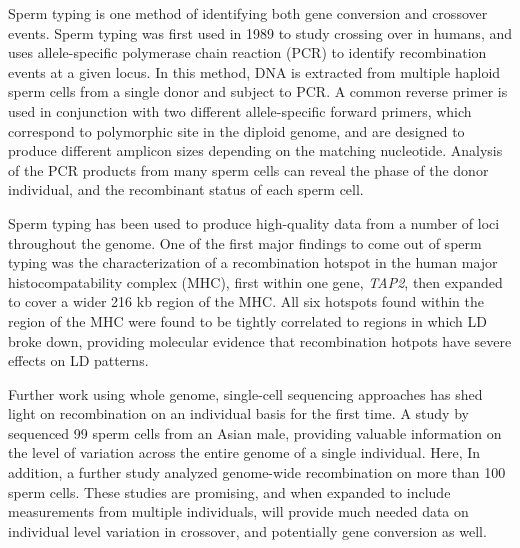 Sperm typing is one method of identifying both gene conversion and crossover events.
Sperm typing was first used in 1989 to study crossing over in humans\cite{Cui1989}, and uses
allele-specific polymerase chain reaction (PCR) to identify recombination events at a given locus.
In this method, DNA is extracted from multiple haploid sperm cells from a single donor and subject to PCR.
A common reverse primer is used in conjunction with two different allele-specific forward primers, which correspond to polymorphic site in the diploid genome, and are designed to produce different amplicon sizes depending on the matching nucleotide.
Analysis of the PCR products from many sperm cells can reveal the phase of the donor individual, and the recombinant status of each sperm cell.

Sperm typing has been used to produce high-quality data from a number of loci throughout the genome.
One of the first major findings to come out of sperm typing was the characterization of a recombination hotspot in the human major histocompatability complex (MHC), first within one gene, \textit{TAP2}\cite{Jeffreys2000}, then expanded to cover a wider 216 kb region of the MHC\cite{Jeffreys2001}.
All six hotspots found within the region of the MHC were found to be tightly correlated to regions in which LD broke down, providing molecular evidence that recombination hotpots have severe effects on LD patterns.



Further work using whole genome, single-cell sequencing approaches has shed light on recombination on an individual basis for the first time.
A study by \citet{Lu2012} sequenced 99 sperm cells from an Asian male, providing valuable information on the level of variation across the entire genome of a single individual.
Here,
In addition, a further study analyzed genome-wide recombination on more than 100 sperm cells\citet{Wang2012}.
These studies are promising, and when expanded to include measurements from multiple individuals, will provide much needed data on individual level variation in crossover, and potentially gene conversion as well.


